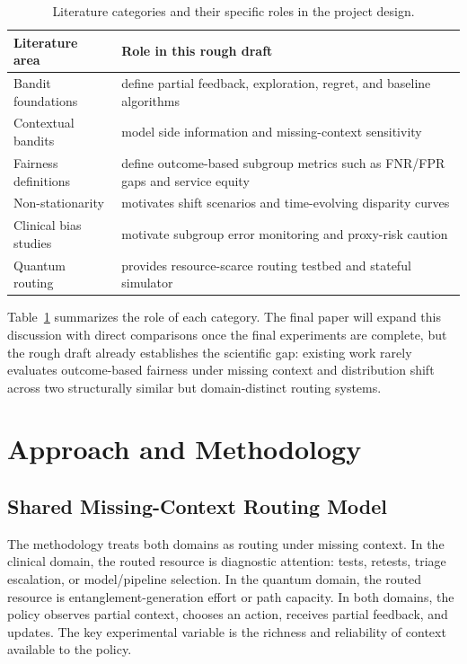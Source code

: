 \documentclass[conference]{IEEEtran}
\begin{document}
\begin{table}[t]
\caption{Literature categories and their specific roles in the project design.}
\label{tab:related_map}
\centering
\small
\begin{tabular}{p{}p{}}
\toprule
\textbf{Literature area} & \textbf{Role in this rough draft} \\
\midrule
Bandit foundations & define partial feedback, exploration, regret, and baseline algorithms \\
Contextual bandits & model side information and missing-context sensitivity \\
Fairness definitions & define outcome-based subgroup metrics such as FNR/FPR gaps and service equity \\
Non-stationarity & motivates shift scenarios and time-evolving disparity curves \\
Clinical bias studies & motivate subgroup error monitoring and proxy-risk caution \\
Quantum routing & provides resource-scarce routing testbed and stateful simulator \\
\bottomrule
\end{tabular}
\end{table}

Table~\ref{tab:related_map} summarizes the role of each category. The final
paper will expand this discussion with direct comparisons once the final
experiments are complete, but the rough draft already establishes the
scientific gap: existing work rarely evaluates outcome-based fairness under
missing context and distribution shift across two structurally similar but
domain-distinct routing systems.

\section{Approach and Methodology}
\subsection{Shared Missing-Context Routing Model}
The methodology treats both domains as routing under missing context. In the
clinical domain, the routed resource is diagnostic attention: tests, retests,
triage escalation, or model/pipeline selection. In the quantum domain, the
routed resource is entanglement-generation effort or path capacity. In both
domains, the policy observes partial context, chooses an action, receives
partial feedback, and updates. The key experimental variable is the richness
and reliability of context available to the policy.
\end{document}
